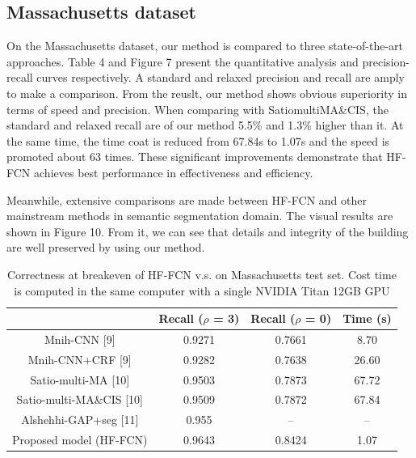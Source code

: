 \subsection{Massachusetts dataset}
On the Massachusetts dataset, our method is compared to three state-of-the-art approaches. Table 4 and Figure 7 present the quantitative analysis and precision-recall curves respectively. A standard and relaxed precision and recall are amply to make a comparison. From the reuslt, our method shows obvious superiority in terms of speed and precision. When comparing with Satio\-multi\-MA\&CIS, the standard and relaxed recall are of our method 5.5{\%} and 1.3{\%} higher than it. At the same time, the time coat is reduced from 67.84s to 1.07s and the speed is promoted about 63 times. These significant improvements demonstrate that HF-FCN achieves best performance in effectiveness and efficiency.\par
\setlength{\parindent}{2ex}Meanwhile, extensive comparisons are made between HF-FCN and other mainstream methods in semantic segmentation domain. The visual results are shown in Figure 10. From it, we can see that details and integrity of the building are well preserved by using our method.
\begin{table}
\centering
\caption {Correctness at breakeven of HF-FCN v.s. \cite{IEEEexample:mnih2013machine}\cite{IEEEexample:saito2016multiple}\cite{IEEEexample:alshehhi2017simultaneous} on Massachusetts test set. Cost time is computed in the same computer with a single NVIDIA Titan 12GB GPU}
\begin{tabular}{cccc}
\hline
&Recall ($\rho$ = 3)&Recall ($\rho$ = 0)&Time (s)\\
\hline
Mnih-CNN [9]&0.9271&0.7661&8.70\\
Mnih-CNN+CRF [9]&0.9282&0.7638&26.60\\
Satio-multi-MA [10]&0.9503&0.7873&67.72\\
Satio-multi-MA\&CIS [10]&0.9509&0.7872&67.84\\
Alshehhi-GAP+seg [11]&0.955&{--}&{--} \\
Proposed model (HF-FCN)&0.9643&0.8424&1.07\\ \hline
\end{tabular}
\end{table}

